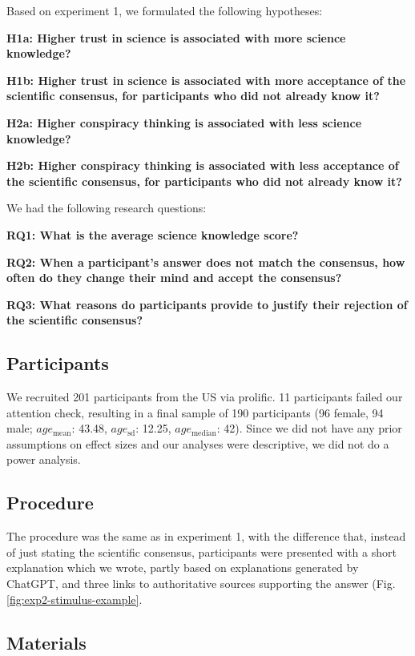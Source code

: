 \documentclass[
  doc,floatsintext]{apa6}
\begin{document}
Based on experiment 1, we formulated the following hypotheses:

\textbf{H1a: Higher trust in science is associated with more science knowledge?}

\textbf{H1b: Higher trust in science is associated with more acceptance of the scientific consensus, for participants who did not already know it?}

\textbf{H2a: Higher conspiracy thinking is associated with less science knowledge?}

\textbf{H2b: Higher conspiracy thinking is associated with less acceptance of the scientific consensus, for participants who did not already know it?}

We had the following research questions:

\textbf{RQ1: What is the average science knowledge score?}

\textbf{RQ2: When a participant's answer does not match the consensus, how often do they change their mind and accept the consensus?}

\textbf{RQ3: What reasons do participants provide to justify their rejection of the scientific consensus?}

\subsection{Participants}\label{participants-2}

We recruited 201 participants from the US via prolific. 11 participants failed our attention check, resulting in a final sample of 190 participants (96 female, 94 male; \(age_\text{mean}\): 43.48, \(age_\text{sd}\): 12.25, \(age_\text{median}\): 42). Since we did not have any prior assumptions on effect sizes and our analyses were descriptive, we did not do a power analysis.

\subsection{Procedure}\label{procedure-1}

The procedure was the same as in experiment 1, with the difference that, instead of just stating the scientific consensus, participants were presented with a short explanation which we wrote, partly based on explanations generated by ChatGPT, and three links to authoritative sources supporting the answer (Fig. \ref{fig:exp2-stimulus-example}.

\subsection{Materials}\label{materials-2}
\end{document}
